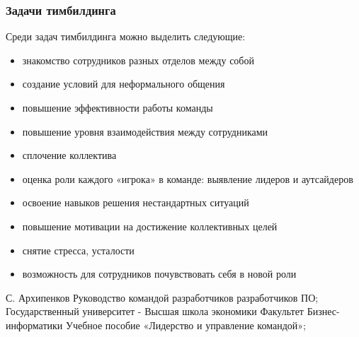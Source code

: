 \documentclass{../industrial-development}
\begin{document}
\begin{frame} \frametitle{Задачи тимбилдинга}
Среди задач тимбилдинга можно выделить следующие:
\begin{itemize}
\item знакомство сотрудников разных отделов между собой
\item создание условий для неформального общения
\item повышение эффективности работы команды
\item повышение уровня взаимодействия между сотрудниками
\item сплочение коллектива
\item оценка роли каждого «игрока» в команде: выявление лидеров и аутсайдеров
\item освоение навыков решения нестандартных ситуаций
\item повышение мотивации на достижение коллективных целей
\item снятие стресса, усталости
\item возможность для сотрудников почувствовать себя в новой роли
\end{itemize}
\end{frame}




\begin{thebibliography}{99}


С. Архипенков Руководство командой разработчиков разработчиков ПО;
Государственный университет  - Высшая школа экономики Факультет Бизнес-информатики Учебное пособие «Лидерство и управление командой»;
\end{thebibliography}
\end{document}
